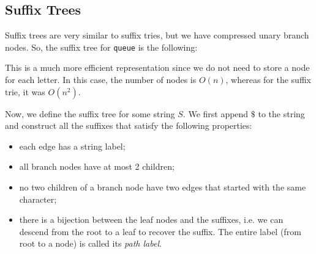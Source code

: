 \documentclass[a4paper, openany]{memoir}
\begin{document}
    \subsection{Suffix Trees}
    Suffix trees are very similar to suffix tries, but we have compressed unary branch nodes. So, the suffix tree for \texttt{queue} is the following:
    \begin{figure}[H]
        \centering
    \end{figure}    
    \noindent This is a much more efficient representation since we do not need to store a node for each letter. In this case, the number of nodes is $O(n)$, whereas for the suffix trie, it was $O(n^2)$.

    Now, we define the suffix tree for some string $S$. We first append $\$$ to the string and construct all the suffixes that satisfy the following properties:
    \begin{itemize}
        \item each edge has a string label;
        \item all branch nodes have at most 2 children;
        \item no two children of a branch node have two edges that started with the same character;
        \item there is a bijection between the leaf nodes and the suffixes, i.e. we can descend from the root to a leaf to recover the suffix. The entire label (from root to a node) is called its \emph{path label}.
    \end{itemize}
\end{document}
